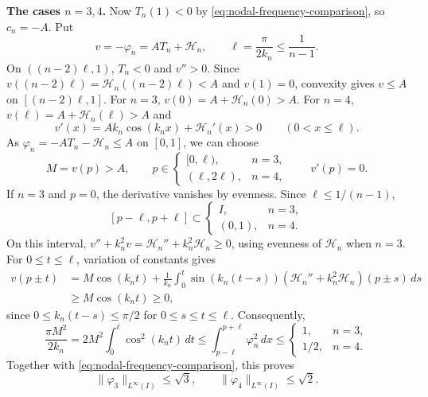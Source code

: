 \documentclass[11pt]{amsart}
\numberwithin{equation}{section}
\theoremstyle{remark}
\newcommand{\norm}[2][]{\lVert #2\rVert_{#1}}
\begin{document}
\medskip\noindent\textbf{The cases $n=3,4$.}
Now $T_n(1)<0$ by \eqref{eq:nodal-frequency-comparison}, so $c_n=-A$.
Put
\[
 v=-\varphi_n=AT_n+\mathcal H_n,\qquad
 \ell=\frac{\pi}{2k_n}\le\frac1{n-1}.
\]
On $((n-2)\ell,1)$, $T_n<0$ and $v''>0$.
Since $v((n-2)\ell)=\mathcal H_n((n-2)\ell)<A$ and $v(1)=0$,
convexity gives $v\le A$ on $[(n-2)\ell,1]$.
For $n=3$, $v(0)=A+\mathcal H_n(0)>A$.
For $n=4$, $v(\ell)=A+\mathcal H_n(\ell)>A$ and
\[
 v'(x)=Ak_n\cos(k_nx)+\mathcal H_n'(x)>0
 \qquad(0<x\le\ell).
\]
As $\varphi_n=-AT_n-\mathcal H_n\le A$ on $[0,1]$, we can choose
\[
 M=v(p)>A,\qquad
 p\in\begin{cases}[0,\ell),&n=3,\\(\ell,2\ell),&n=4,\end{cases}
 \qquad v'(p)=0.
\]
If $n=3$ and $p=0$, the derivative vanishes by evenness.
Since $\ell\le1/(n-1)$,
\[
 [p-\ell,p+\ell]\subset
 \begin{cases}I,&n=3,\\(0,1),&n=4.\end{cases}
\]
On this interval,
$v''+k_n^2v=\mathcal H_n''+k_n^2\mathcal H_n\ge0$,
using evenness of $\mathcal H_n$ when $n=3$.
For $0\le t\le\ell$, variation of constants gives
\[
 \begin{aligned}
 v(p\pm t)
 &=M\cos(k_nt)+\frac1{k_n}\int_0^t\sin(k_n(t-s))
   (\mathcal H_n''+k_n^2\mathcal H_n)(p\pm s)\,ds\\
 &\ge M\cos(k_nt)\ge0,
 \end{aligned}
\]
since $0\le k_n(t-s)\le\pi/2$ for $0\le s\le t\le\ell$.
Consequently,
\[
 \frac{\pi M^2}{2k_n}
 =2M^2\int_0^\ell\cos^2(k_nt)\,dt
 \le\int_{p-\ell}^{p+\ell}\varphi_n^2\,dx
 \le\begin{cases}1,&n=3,\\1/2,&n=4.\end{cases}
\]
Together with \eqref{eq:nodal-frequency-comparison}, this proves
\begin{equation}\label{eq:third-fourth-Linfty}
 \norm[L^\infty(I)]{\varphi_3}\le\sqrt3,\qquad
 \norm[L^\infty(I)]{\varphi_4}\le\sqrt2.
\end{equation}
\end{document}
